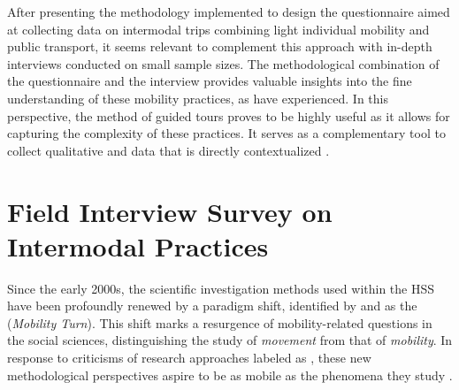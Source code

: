 \begin{refsegment}
After presenting the methodology implemented to design the questionnaire aimed at collecting data on intermodal trips combining light individual mobility and public transport, it seems relevant to complement this approach with in-depth interviews conducted on small sample sizes. The methodological combination of the questionnaire and the interview provides valuable insights into the fine understanding of these mobility practices, as \textcolor{blue}{\textcite[97]{dureau_lobservation_2014}} have experienced. In this perspective, the method of guided tours proves to be highly useful as it allows for capturing the complexity of these practices. It serves as a complementary tool to collect qualitative and  data that is directly contextualized \textcolor{blue}{\autocite[109]{bergeron_uncovering_2014}}.%

\newpage
{} %
\section{Field Interview Survey on Intermodal Practices
    \label{chap3:parcours-commente}
    }

Since the early 2000s, the scientific investigation methods used within the \acrfull{HSS} have been profoundly renewed by a paradigm shift, identified by \textcolor{blue}{\textcite[207]{sheller_new_2006}} and \textcolor{blue}{\textcite{bonnet_territoires_2000}} as the  (\textsl{Mobility Turn}). This shift marks a resurgence of mobility-related questions in the social sciences, distinguishing the study of \textsl{movement} from that of \textsl{mobility}. In response to criticisms of research approaches labeled as , these new methodological perspectives aspire to be as mobile as the phenomena they study \textcolor{blue}{\autocite[207]{buscher_mobile_2009}}.%


\end{refsegment}
